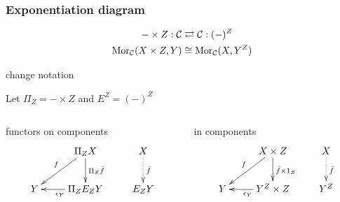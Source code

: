 \begin{frame}[t]
\frametitle{Exponentiation diagram}
\begin{block}{}
\abovedisplayskip=0pt
\begin{align*}
- \times Z: \mathcal{C} & \rightleftarrows \mathcal{C}: (-)^Z\\
\mathop{\rm Mor}\nolimits_{\mathcal{C}}(X \times Z, Y) & \cong  \mathop{\rm Mor}\nolimits_{\mathcal{C}}(X, Y^Z)
\end{align*}
\end{block}
\begin{block}{change notation}
	\begin{center}
	Let $\Pi_Z = - \times Z$ and $E^Z = (-)^Z$
	\end{center}
\end{block}
\begin{columns}[t]
    \begin{column}{0.5\textwidth}
		\begin{block}{functors on components}
			$$
			\xymatrix{
			& \Pi_Z X \ar[d]^{\Pi_Z \bar{f}} \ar[dl]_{f} & X \ar@{.>}[d]^{\bar{f}}\\
			Y & \Pi_Z E_Z Y \ar[l]^{\epsilon_Y} & E_Z Y}
			$$
		\end{block}		
    \end{column}
    \begin{column}{0.5\textwidth}
		\begin{block}{in components}
			$$
			\xymatrix{
			& X \times Z \ar[d]^{\bar{f} \times 1_Z} \ar[dl]_{f} & X \ar@{.>}[d]^{\bar{f}}\\
			Y & Y^Z \times Z \ar[l]^{\epsilon_Y} & Y^Z}
			$$
		\end{block}
    \end{column}
\end{columns}
\end{frame}
